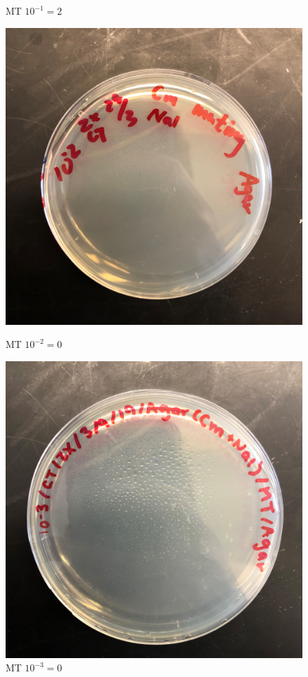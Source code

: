 \documentclass{article}
\begin{document}
\begin{figure}[H]
\begin{minipage}[t]{0.24\textwidth}
					\caption{MT $10^{-1} = 2$}
				\end{minipage}
				\begin{minipage}[t]{0.24\textwidth}
					\centering
					\includegraphics[width = 0.9\linewidth]{Mate_2_NalCm.jpg}
					\caption{MT $10 ^ {-2} = 0$}
				\end{minipage}
				\begin{minipage}[t]{0.24\textwidth}
					\centering
					\includegraphics[width = 0.9\linewidth]{Mate_3_NalCm.jpg}
					\caption{MT $10 ^ {-3} = 0$}
				\end{minipage}
			\end{figure}
\end{document}
